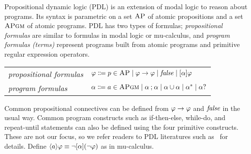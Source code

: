 \documentclass{amsart}
\begin{document}
Propositional dynamic logic (PDL) is an extension of modal logic
to reason about programs.
Its syntax is parametric on a set $\textsc{AP}$ of atomic propositions
and a set $\textsc{APgm}$ of atomic programs.
PDL has two types of formulas;
\emph{propositional formulas} are similar to formulas in modal logic or mu-calculus,
and \emph{program formulas (terms)} represent programs built from atomic programs
and primitive regular expression operators.
\begin{center}
\begin{tabular}{ll}
\emph{propositional formulas} &
$\varphi \Coloneqq
p \in \textsc{AP} \mid
\varphi \to \varphi \mid
\mathit{false} \mid
[\alpha] \varphi$
\\
\emph{program formulas} &
$\alpha \Coloneqq
a \in \textsc{APgm} \mid
\alpha \mathbin{;} \alpha \mid
\alpha \mathbin{\cup} \alpha \mid
\alpha ^* \mid
\alpha {?} $
\end{tabular}
\end{center}
Common propositional connectives can be defined
from $\varphi \to \varphi$ and $\mathit{false}$ in the usual way.
Common program constructs such as if-then-else,
while-do, and repeat-until statements can also be defined using the four primitive constructs.
These are not our focus, so we refer readers to PDL literatures such as~\cite{bibid}
for details.
Define $\langle a\rangle \varphi \equiv \neg [\alpha] (\neg \varphi)$ as in mu-calculus.
\end{document}
